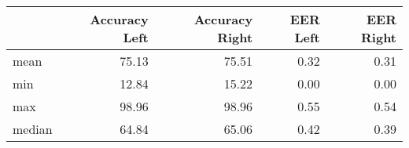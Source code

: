 \begin{tabular}{lrrrr}
\toprule
{} &  Accuracy Left &  Accuracy Right &  EER Left &  EER Right \\
\midrule
mean   &          75.13 &           75.51 &      0.32 &       0.31 \\
min    &          12.84 &           15.22 &      0.00 &       0.00 \\
max    &          98.96 &           98.96 &      0.55 &       0.54 \\
median &          64.84 &           65.06 &      0.42 &       0.39 \\
\bottomrule
\end{tabular}
